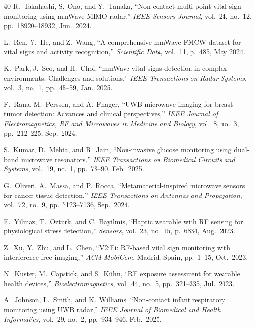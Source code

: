 \documentclass[journal,twoside]{IEEEtran}
\begin{document}
\begin{thebibliography}{40}
R.~Takahashi, S.~Ono, and Y.~Tanaka, ``Non-contact multi-point vital sign monitoring using mmWave MIMO radar,'' \emph{IEEE Sensors Journal}, vol.~24, no.~12, pp.~18920--18932, Jun.\ 2024.

L.~Ren, Y.~He, and Z.~Wang, ``A comprehensive mmWave FMCW dataset for vital signs and activity recognition,'' \emph{Scientific Data}, vol.~11, p.~485, May 2024.

K.~Park, J.~Seo, and H.~Choi, ``mmWave vital signs detection in complex environments: Challenges and solutions,'' \emph{IEEE Transactions on Radar Systems}, vol.~3, no.~1, pp.~45--59, Jan.\ 2025.

F.~Rana, M.~Persson, and A.~Fhager, ``UWB microwave imaging for breast tumor detection: Advances and clinical perspectives,'' \emph{IEEE Journal of Electromagnetics, RF and Microwaves in Medicine and Biology}, vol.~8, no.~3, pp.~212--225, Sep.\ 2024.

S.~Kumar, D.~Mehta, and R.~Jain, ``Non-invasive glucose monitoring using dual-band microwave resonators,'' \emph{IEEE Transactions on Biomedical Circuits and Systems}, vol.~19, no.~1, pp.~78--90, Feb.\ 2025.

G.~Oliveri, A.~Massa, and P.~Rocca, ``Metamaterial-inspired microwave sensors for cancer tissue detection,'' \emph{IEEE Transactions on Antennas and Propagation}, vol.~72, no.~9, pp.~7123--7136, Sep.\ 2024.

E.~Yilmaz, T.~Ozturk, and C.~Bayilmis, ``Haptic wearable with RF sensing for physiological stress detection,'' \emph{Sensors}, vol.~23, no.~15, p.~6834, Aug.\ 2023.

Z.~Xu, Y.~Zhu, and L.~Chen, ``V2iFi: RF-based vital sign monitoring with interference-free imaging,'' \emph{ACM MobiCom}, Madrid, Spain, pp.~1--15, Oct.\ 2023.

N.~Kuster, M.~Capstick, and S.~Kühn, ``RF exposure assessment for wearable health devices,'' \emph{Bioelectromagnetics}, vol.~44, no.~5, pp.~321--335, Jul.\ 2023.

A.~Johnson, L.~Smith, and K.~Williams, ``Non-contact infant respiratory monitoring using UWB radar,'' \emph{IEEE Journal of Biomedical and Health Informatics}, vol.~29, no.~2, pp.~934--946, Feb.\ 2025.


\end{thebibliography}
\end{document}
